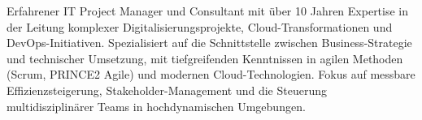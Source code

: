 

\begin{cvparagraph}

Erfahrener IT Project Manager und Consultant mit über 10 Jahren Expertise in der Leitung komplexer Digitalisierungsprojekte, Cloud-Transformationen und DevOps-Initiativen. Spezialisiert auf die Schnittstelle zwischen Business-Strategie und technischer Umsetzung, mit tiefgreifenden Kenntnissen in agilen Methoden (Scrum, PRINCE2 Agile) und modernen Cloud-Technologien. Fokus auf messbare Effizienzsteigerung, Stakeholder-Management und die Steuerung multidisziplinärer Teams in hochdynamischen Umgebungen.
\end{cvparagraph}
